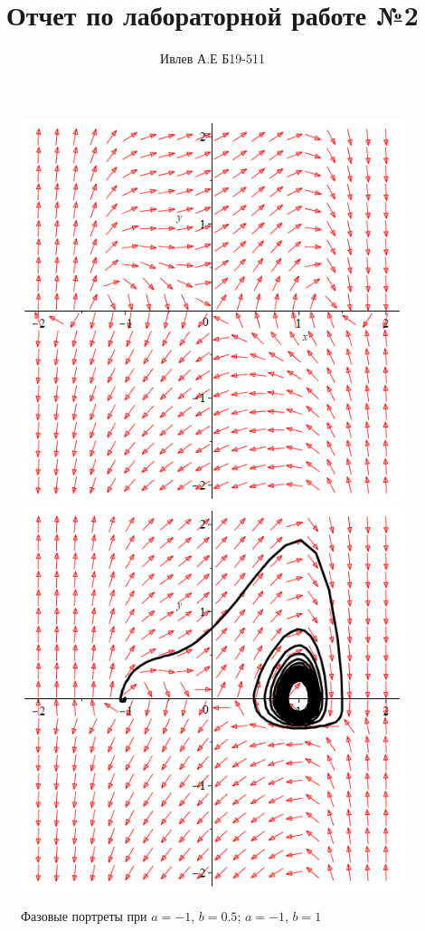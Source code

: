 \documentclass[10pt,a4paper]{article}
\title{Отчет по лабораторной работе №2}
\author{Ивлев А.Е Б19-511}
\begin{document}
	\maketitle
	
	\begin{figure}[h]
		\centering
		{\includegraphics[scale=0.3]{Lab2 phase portrait a=-1, b=0.5}}
		{\includegraphics[scale=0.3]{Lab2 phase portrait a=-1, b=1}}
		\caption{Фазовые портреты при $a = -1$, $b = 0.5$; $a = -1$, $b = 1$}
		\label{image/1}
	\end{figure}
\end{document}
